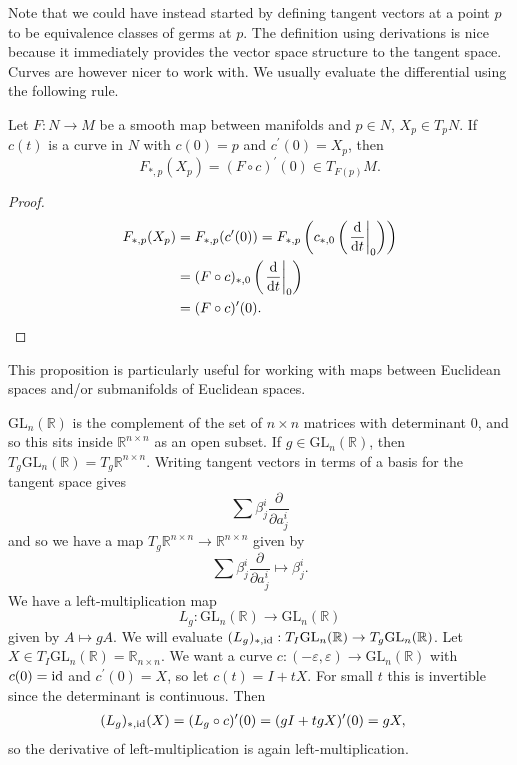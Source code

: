 Note that we could have instead started by defining tangent vectors at
a point $p$ to be equivalence classes of germs at $p$. The definition
using derivations is nice because it immediately provides the vector
space structure to the tangent space. Curves are however nicer to work
with. We usually evaluate the differential using the following rule.

\begin{prop}
Let $F: N \to M$ be a smooth map between manifolds and
$p \in N$, $X_p \in T_p N$. If $c(t)$ is a curve in $N$ with
$c(0) = p$ and $c^\prime(0) = X_p$, then
$$
  F_{\ast, p}(X_p)
= (F \circ c)^\prime(0) \in T_{F(p)} M.
$$
\end{prop}
\begin{proof}
\begin{align*}
   F_{\ast, p}(X_p)
&= F_{\ast, p}(c^\prime(0))
 = F_{\ast, p}
     \left(
       c_{\ast,0}
       \left(
         \left.\frac{\mathop{}\!\mathrm{d}}{\mathop{}\!\mathrm{d} t}\right|_0
       \right)
     \right) \\
&= (F \circ c)_{\ast, 0}
     \left(
       \left.\frac{\mathop{}\!\mathrm{d}}{\mathop{}\!\mathrm{d} t}\right|_0
     \right) \\
&= (F \circ c)^\prime(0).
\end{align*}
\end{proof}

\begin{remark}
This proposition is particularly useful for working with maps between
Euclidean spaces and/or submanifolds of Euclidean spaces.
\end{remark}

\begin{xmpl}
$\mathrm{GL}_n(\mathbb{R})$ is the complement of the set of $n \times
n$ matrices with determinant 0, and so this sits inside $\mathbb{R}^{n
  \times n}$ as an open subset. If $g \in \mathrm{GL}_n(\mathbb{R})$,
then $T_g \mathrm{GL}_n(\mathbb{R}) = T_g \mathbb{R}^{n \times n}$.
Writing tangent vectors in terms of a basis for the tangent space gives
$$
\sum
  \beta^i_j \frac{\partial}{\partial a^i_j}
$$
and so we have a map
$T_g \mathbb{R}^{n \times n} \to \mathbb{R}^{n \times n}$ given by
$$
\sum
  \beta^i_j \frac{\partial}{\partial a^i_j}
\mapsto
  \beta^i_j.
$$
We have a left-multiplication map
$$
L_g: \mathrm{GL}_n(\mathbb{R}) \to \mathrm{GL}_n(\mathbb{R})
$$
given by $A \mapsto gA$. We will evaluate
$(L_g)_{\ast, \mathrm{id}} : T_I \mathrm{GL}_n(\mathbb{R}) \to T_g \mathrm{GL}_n(\mathbb{R})$.
Let $X \in T_I \mathrm{GL}_n(\mathbb{R}) = \mathbb{R}_{n \times
  n}$. We want a curve
$c: (-\varepsilon, \varepsilon) \to \mathrm{GL}_n(\mathbb{R})$ with
$c(0) = \mathrm{id}$ and $c^\prime(0) = X$, so let $c(t) = I + t X$. For
small $t$ this is invertible since the determinant is continuous. Then
\begin{align*}
   (L_g)_{\ast, \mathrm{id}}(X)
&= (L_g \circ c)^\prime(0)
 = (gI + tgX)^\prime(0)
 = gX,
\end{align*}
so the derivative of left-multiplication is again left-multiplication.
\end{xmpl}
